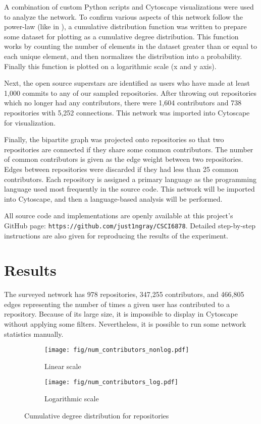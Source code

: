 \documentclass[11pt]{article}
\begin{document}
A combination of custom Python scripts and Cytoscape \cite{cytoscape} visualizations were used to analyze the network. To confirm various aspects of this network follow the power-law (like in \cite{paper}), a cumulative distribution function was written to prepare some dataset for plotting as a cumulative degree distribution. This function works by counting the number of elements in the dataset greater than or equal to each unique element, and then normalizes the distribution into a probability. Finally this function is plotted on a logarithmic scale (x and y axis).

Next, the open source superstars are identified as users who have made at least 1,000 commits to any of our sampled repositories. After throwing out repositories which no longer had any contributors, there were 1,604 contributors and 738 repositories with 5,252 connections. This network was imported into Cytoscape for visualization.

Finally, the bipartite graph was projected onto repositories so that two repositories are connected if they share some common contributors. The number of common contributors is given as the edge weight between two repositories. Edges between repositories were discarded if they had less than 25 common contributors. Each repository is assigned a primary language as the programming language used most frequently in the source code. This network will be imported into Cytoscape, and then a language-based analysis will be performed.

All source code and implementations are openly available at this project's GitHub page: \texttt{https://github.com/just1ngray/CSCI6878}. Detailed step-by-step instructions are also given for reproducing the results of the experiment.



\section{Results}
\label{sec:results}
The surveyed network has 978 repositories, 347,255 contributors, and 466,805 edges representing the number of times a given user has contributed to a repository. Because of its large size, it is impossible to display in Cytoscape without applying some filters. Nevertheless, it is possible to run some network statistics manually.

\begin{figure}[H]
  \centering
  \begin{subfigure}{0.49\textwidth}
    \texttt{[image: fig/num\_contributors\_nonlog.pdf]}
    \caption{Linear scale}
    \label{fig:num_contributors:nonlog}
  \end{subfigure}
  \begin{subfigure}{0.49\textwidth}
    \texttt{[image: fig/num\_contributors\_log.pdf]}
    \caption{Logarithmic scale}
    \label{fig:num_contributors:log}
  \end{subfigure}
  \caption{Cumulative degree distribution for repositories}
  \label{fig:num_contributors}
\end{figure}
\end{document}

